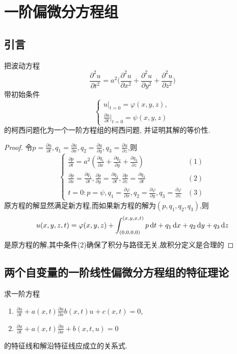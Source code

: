 \chapter{一阶偏微分方程组}

\section{引言}

\begin{exercise}
  把波动方程
  \[\frac{\partial^2u}{\partial t^2} = a^2 
    \biggl(\frac{\partial^2u}{\partial x^2} + \frac{\partial^2u}{\partial y^2}
    + \frac{\partial^2u}{\partial z^2}\biggr)\]
  带初始条件
  \[\begin{cases}
    u|_{t=0} = \varphi(x,y,z), \\
    \frac{\partial u}{\partial t}|_{t=0} = \psi(x,y,z)
  \end{cases}\]
  的柯西问题化为一个一阶方程组的柯西问题, 并证明其解的等价性.
\end{exercise}

\begin{proof}
  令$p=\frac{\partial u}{\partial t},q_1=\frac{\partial u}{\partial x},q_2=\frac{\partial u}{\partial y},q_3=\frac{\partial u}{\partial z}$,则
  \[\begin{cases}
  \frac{\partial p}{\partial t}=a^2\left(\frac{\partial q_1}{\partial x}+\frac{\partial q_2}{\partial y}+\frac{\partial q_3}{\partial z}\right)&(1)\\
  \frac{\partial p}{\partial x}=\frac{\partial q_1}{\partial t},\frac{\partial p}{\partial y}=\frac{\partial q_2}{\partial t},\frac{\partial p}{\partial z}=\frac{\partial q_3}{\partial t}&(2)\\
  t=0:p=\psi,q_1=\frac{\partial\varphi}{\partial x},q_2=\frac{\partial\varphi}{\partial y},q_3=\frac{\partial\varphi}{\partial z}&(3)
  \end{cases}\]
  原方程的解显然满足新方程,而如果新方程的解为$(p,q_1,q_2,q_3)$,则
  \[u(x,y,z,t)=\varphi(x,y,z)+\int_{(0,0,0,0)}^{(x,y,x,t)}p\mathop{}\!\mathrm{d} t+q_1\mathop{}\!\mathrm{d} x+q_2\mathop{}\!\mathrm{d} y+q_3\mathop{}\!\mathrm{d} z\]
  是原方程的解,其中条件(2)确保了积分与路径无关,故积分定义是合理的
\end{proof}


\section{两个自变量的一阶线性偏微分方程组的特征理论}

\begin{exercise}
  求一阶方程
  \begin{enumerate}[(1)]
    \item $\frac{\partial u}{\partial t} + a(x,t) \frac{\partial u}{\partial x} 
      b(x,t)u + c(x,t) = 0$,
    \item $\frac{\partial u}{\partial t} + a(x,t) \frac{\partial u}{\partial x}
      + b(x,t,u) = 0$
  \end{enumerate}
  的特征线和解沿特征线应成立的关系式.
\end{exercise}

